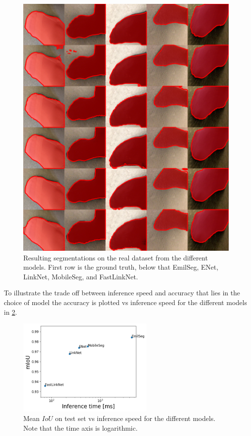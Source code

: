 \documentclass{kththesis}
\begin{document}
\begin{figure}[h]
  \centering
  \includegraphics[width=\textwidth]{real_color}
  \caption{Resulting segmentations on the real dataset from the different models. First row is the ground
    truth, below that EmilSeg, ENet, LinkNet, MobileSeg, and FastLinkNet.}
  \label{fig:seg_real}
  \end{figure}

To illustrate the trade off between inference speed and accuracy that lies in
the choice of model the accuracy is plotted vs inference speed for the different
models in \cref{fig:speed_vs_iou}.

\begin{figure}[h]
  \centering
  \includegraphics[width=0.6\textwidth]{Speed_vs_IoU}
  \caption{Mean \(IoU\) on test set vs inference speed for the different models. Note that
    the time axis is logarithmic.}
  \label{fig:speed_vs_iou}
\end{figure}
\end{document}
